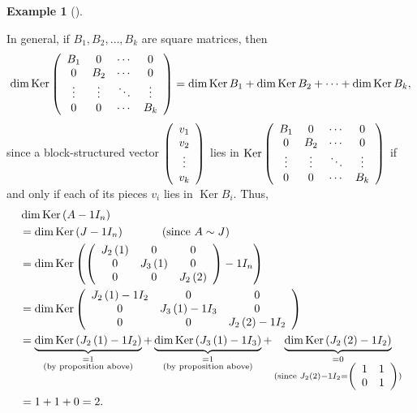 \documentclass[numbers=enddot,12pt,final,onecolumn,notitlepage]{scrartcl}%
\numberwithin{exer}{subsection}
\theoremstyle{definition}
\newtheorem{exam}[theo]{Example}
\newenvironment{example}[1][]
{\begin{exam}[#1]\begin{leftbar}}
{\end{leftbar}\end{exam}}
\begin{document}
\begin{example}
In general, if $B_{1},B_{2},\ldots,B_{k}$ are square matrices, then
\[
\dim\operatorname*{Ker}\left(
\begin{array}
[c]{cccc}%
B_{1} & 0 & \cdots & 0\\
0 & B_{2} & \cdots & 0\\
\vdots & \vdots & \ddots & \vdots\\
0 & 0 & \cdots & B_{k}%
\end{array}
\right)  =\dim\operatorname*{Ker}B_{1}+\dim\operatorname*{Ker}B_{2}%
+\cdots+\dim\operatorname*{Ker}B_{k},
\]
since a block-structured vector $\left(
\begin{array}
[c]{c}%
v_{1}\\
v_{2}\\
\vdots\\
v_{k}%
\end{array}
\right)  $ lies in $\operatorname*{Ker}\left(
\begin{array}
[c]{cccc}%
B_{1} & 0 & \cdots & 0\\
0 & B_{2} & \cdots & 0\\
\vdots & \vdots & \ddots & \vdots\\
0 & 0 & \cdots & B_{k}%
\end{array}
\right)  $ if and only if each of its pieces $v_{i}$ lies in
$\operatorname*{Ker}B_{i}$. Thus,%
\begin{align*}
& \dim\operatorname*{Ker}\left(  A-1I_{n}\right)  \\
& =\dim\operatorname*{Ker}\left(  J-1I_{n}\right)  \ \ \ \ \ \ \ \ \ \ \left(
\text{since }A\sim J\right)  \\
& =\dim\operatorname*{Ker}\left(  \left(
\begin{array}
[c]{ccc}%
J_{2}\left(  1\right)   & 0 & 0\\
0 & J_{3}\left(  1\right)   & 0\\
0 & 0 & J_{2}\left(  2\right)
\end{array}
\right)  -1I_{n}\right)  \\
& =\dim\operatorname*{Ker}\left(
\begin{array}
[c]{ccc}%
J_{2}\left(  1\right)  -1I_{2} & 0 & 0\\
0 & J_{3}\left(  1\right)  -1I_{3} & 0\\
0 & 0 & J_{2}\left(  2\right)  -1I_{2}%
\end{array}
\right)  \\
& =\underbrace{\dim\operatorname*{Ker}\left(  J_{2}\left(  1\right)
-1I_{2}\right)  }_{\substack{=1\\\text{(by proposition above)}}%
}+\underbrace{\dim\operatorname*{Ker}\left(  J_{3}\left(  1\right)
-1I_{3}\right)  }_{\substack{=1\\\text{(by proposition above)}}%
}+\underbrace{\dim\operatorname*{Ker}\left(  J_{2}\left(  2\right)
-1I_{2}\right)  }_{\substack{=0\\\text{(since }J_{2}\left(  2\right)
-1I_{2}=\left(
\begin{array}
[c]{cc}%
1 & 1\\
0 & 1
\end{array}
\right)  \text{)}}}\\
& =1+1+0=2.
\end{align*}


\end{example}
\end{document}
